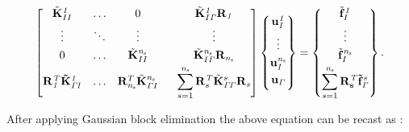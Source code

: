 \documentclass{article}
\begin{document}
\begin{equation}\label{Eq:GAssembly}
{\begin{bmatrix}
     \tilde{\mathbf{K}}_{II}^{\it{1}} & \dots  &   0    \ \  &  \tilde{\mathbf{K}}_{I {\it{\Gamma}}}^{\it{1}} \mathbf{R}_{\it{1}}
\\[0.3em]
     \vdots   & \ddots & \vdots \ \  &  \vdots
\\[0.3em]
     0        & \dots  &  \tilde{\mathbf{K}}_{II}^{\it{n_s}} \ \ &  \tilde{\mathbf{K}}_{I {\it{\Gamma}}}^{\it{n_s}} \mathbf{R}_{\it{n_s}}
\\[0.3em]
    \bf{R}^{\it{T}}_{\it{1}} \tilde{\mathbf{K}}_{\it{\Gamma I}}^{\it{1}} & \dots  &  \mathbf{R}^T_{\it{n_s}} \tilde{\mathbf{K}}_{{\it{\Gamma}} I}^{\it{n_s}} \ \ & \displaystyle\sum_{s=1}^{\it{n_s}} \mathbf{R}^{\it{T}}_s \tilde{\mathbf{K}}_{{\it{\Gamma}} {\it{\Gamma}}}^s \mathbf{R}_{\it{s}}
\end{bmatrix}}
\begin{Bmatrix}
     \bf{u}_{\it{I}}^{\it{1}}
\\[0.3em]
     \vdots
\\[0.3em]
      \bf{u}_{\it{I}}^{\it{n_s}}
\\[0.3em]
      \bf{u}_{\it{\Gamma}}
\\[0.3em]
\end{Bmatrix}  =
\begin{Bmatrix}
     \tilde{\mathbf{f}}_I^{\it{1}}
\\[0.3em]
     \vdots
\\[0.3em]
     \tilde{\mathbf{f}}_{I}^{\it{n_s}}
\\[0.3em]
     \displaystyle\sum_{s=1}^{\it{n_s}} \bf{R}^{\it{T}}_s  \tilde{f}_{\it{\Gamma}}^{\it{s}}
\end{Bmatrix}.
\end{equation}

After applying Gaussian block elimination the above equation can be recast as \cite{SG_DD_sarkar}:
\end{document}
